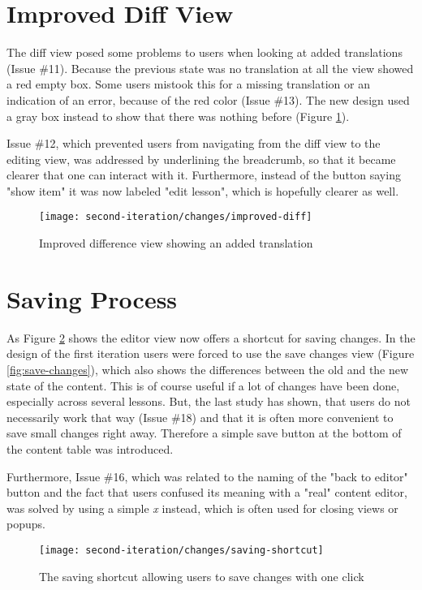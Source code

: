 \section{Improved Diff View}
The diff view posed some problems to users when looking at added translations (Issue \#11). Because the previous state was no translation at all the view showed a red empty box. Some users mistook this for a missing translation or an indication of an error, because of the red color (Issue \#13). The new design used a gray box instead to show that there was nothing before (Figure \ref{fig:improved-diff-view}).

Issue \#12, which prevented users from navigating from the diff view to the editing view, was addressed by underlining the breadcrumb, so that it became clearer that one can interact with it. Furthermore, instead of the button saying "show item" it was now labeled "edit lesson", which is hopefully clearer as well.

\begin{figure}[h!]
 \centering
 \texttt{[image: second-iteration/changes/improved-diff]}
 \caption{Improved difference view showing an added translation}
 \label{fig:improved-diff-view}
\end{figure}

\section{Saving Process}
As Figure \ref{fig:saving-shortcut} shows the editor view now offers a shortcut for saving changes. In the design of the first iteration users were forced to use the save changes view (Figure \ref{fig:save-changes}), which also shows the differences between the old and the new state of the content. This is of course useful if a lot of changes have been done, especially across several lessons. But, the last study has shown, that users do not necessarily work that way (Issue \#18) and that it is often more convenient to save small changes right away. Therefore a simple save button at the bottom of the content table was introduced.

Furthermore, Issue \#16, which was related to the naming of the "back to editor" button and the fact that users confused its meaning with a "real" content editor, was solved by using a simple \emph{x} instead, which is often used for closing views or popups.

\begin{figure}[h!]
 \centering
 \texttt{[image: second-iteration/changes/saving-shortcut]}
 \caption{The saving shortcut allowing users to save changes with one click}
 \label{fig:saving-shortcut}
\end{figure}

